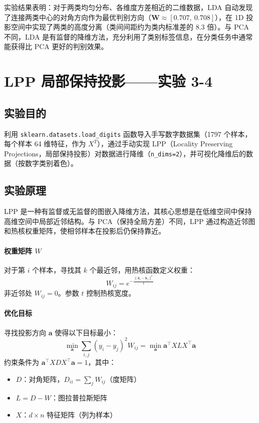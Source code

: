 \documentclass[10.5pt]{config}
\begin{document}
实验结果表明：对于两类均匀分布、各维度方差相近的二维数据，LDA 自动发现了连接两类中心的对角方向作为最优判别方向（$\mathbf{W} \approx [0.707,\ 0.708]$），在 1D 投影空间中实现了两类的高度分离（类间间距约为类内标准差的 8.3 倍）。与 PCA 不同，LDA 是有监督的降维方法，充分利用了类别标签信息，在分类任务中通常能获得比 PCA 更好的判别效果。


\clearpage
\section{LPP 局部保持投影——实验 3-4}

\subsection{实验目的}

利用 \texttt{sklearn.datasets.load\_digits} 函数导入手写数字数据集（1797 个样本，每个样本 64 维特征，作为 $X^T$），通过手动实现 LPP（Locality Preserving Projections，局部保持投影）对数据进行降维（\texttt{n\_dims=2}），并可视化降维后的数据（按数字类别着色）。

\subsection{实验原理}

LPP 是一种有监督或无监督的图嵌入降维方法，其核心思想是在低维空间中保持高维空间中局部近邻结构。与 PCA（保持全局方差）不同，LPP 通过构造近邻图和热核权重矩阵，使相邻样本在投影后仍保持靠近。

\paragraph{权重矩阵 $W$}
对于第 $i$ 个样本，寻找其 $k$ 个最近邻，用热核函数定义权重：
$$W_{ij} = e^{-\frac{\|\mathbf{x}_i - \mathbf{x}_j\|^2}{t}}$$
非近邻处 $W_{ij} = 0$。参数 $t$ 控制热核宽度。

\paragraph{优化目标}
寻找投影方向 $\mathbf{a}$ 使得以下目标最小：
$$\min_{\mathbf{a}} \sum_{i,j} (y_i - y_j)^2 W_{ij} = \min_{\mathbf{a}} \mathbf{a}^\top X L X^\top \mathbf{a}$$
约束条件为 $\mathbf{a}^\top X D X^\top \mathbf{a} = 1$，其中：
\begin{itemize}
    \item $D$：对角矩阵，$D_{ii} = \sum_j W_{ij}$（度矩阵）
    \item $L = D - W$：图拉普拉斯矩阵
    \item $X$：$d \times n$ 特征矩阵（列为样本）
\end{itemize}
\end{document}
